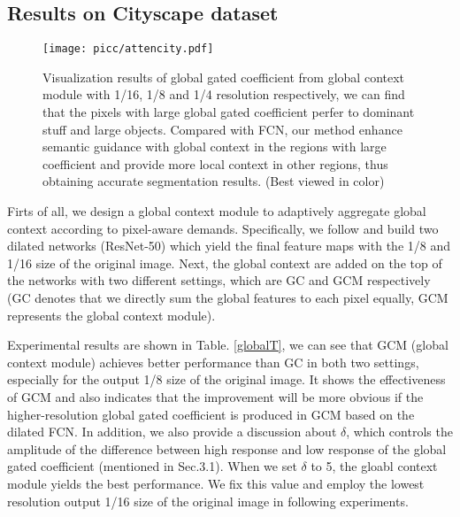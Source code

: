 \documentclass[10pt,twocolumn,letterpaper]{article}
\begin{document}
\subsection{Results on Cityscape dataset}



\begin{figure*}[!t]
        \centering
        \texttt{[image: picc/attencity.pdf]}
        \caption{Visualization results of global gated coefficient from
global context module with 1/16, 1/8 and 1/4 resolution respectively, we can find that the  pixels with large global gated coefficient perfer to dominant stuff and large objects. Compared with FCN, our method enhance semantic guidance with global context in the regions with large coefficient and provide more local context in other regions, thus obtaining accurate segmentation results. (Best viewed in color) }
         \label{attencity}\end{figure*}



 Firts of all, we design a global context module to adaptively aggregate global context according to pixel-aware demands. 
Specifically, we follow \cite{deeplabv2} and build two dilated networks (ResNet-50) which yield the final feature maps with the 1/8 and 1/16 size of the original image. Next, the global context are added on the top of the networks with two different settings, which are  GC and GCM respectively (GC denotes that we directly sum the global features to each pixel equally, GCM represents  the global context module).

Experimental results are shown in Table. \ref{globalT}, we can see that GCM (global context module) achieves better performance than GC in both two settings,  especially for the output 1/8 size of the original image. It shows the effectiveness of GCM and also indicates that the improvement will be more obvious if the higher-resolution  global gated coefficient is produced in GCM based on the dilated FCN.
In addition, we also provide a discussion about $\delta$, which controls the amplitude of the difference between high response and low response of the global gated coefficient (mentioned in Sec.3.1). When we set $\delta$ to 5, the gloabl context module yields the best performance. We fix this value and employ  the lowest resolution output 1/16 size of the original image in following experiments.
\end{document}
